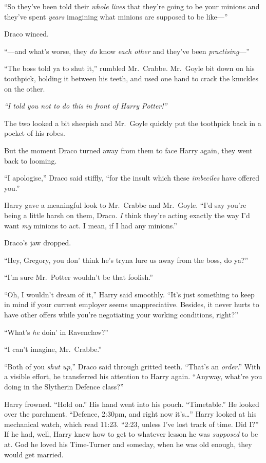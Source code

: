 ``So they've been told their \emph{whole lives} that they're going to be
your minions and they've spent \emph{years} imagining what minions are
supposed to be like---''

Draco winced.

``---and what's worse, they \emph{do} know \emph{each other} and they've
been \emph{practising}---''

``The boss told ya to shut it,'' rumbled Mr.~Crabbe. Mr.~Goyle bit down
on his toothpick, holding it between his teeth, and used one hand to
crack the knuckles on the other.

\emph{``I told you not to do this in front of Harry Potter!''}

The two looked a bit sheepish and Mr.~Goyle quickly put the toothpick
back in a pocket of his robes.

But the moment Draco turned away from them to face Harry again, they
went back to looming.

``I apologise,'' Draco said stiffly, ``for the insult which these
\emph{imbeciles} have offered you.''

Harry gave a meaningful look to Mr.~Crabbe and Mr.~Goyle. ``I'd say
you're being a little harsh on them, Draco. \emph{I} think they're
acting exactly the way I'd want \emph{my} minions to act. I mean, if I
had any minions.''

Draco's jaw dropped.

``Hey, Gregory, you don' think he's tryna lure us away from the boss, do
ya?''

``I'm sure Mr.~Potter wouldn't be that foolish.''

``Oh, I wouldn't dream of it,'' Harry said smoothly. ``It's just
something to keep in mind if your current employer seems unappreciative.
Besides, it never hurts to have other offers while you're negotiating
your working conditions, right?''

``What's \emph{he} doin' in Ravenclaw?''

``I can't imagine, Mr.~Crabbe.''

``Both of you \emph{shut up},'' Draco said through gritted teeth.
``That's an \emph{order}.'' With a visible effort, he transferred his
attention to Harry again. ``Anyway, what're you doing in the Slytherin
Defence class?''

Harry frowned. ``Hold on.'' His hand went into his pouch. ``Timetable.''
He looked over the parchment. ``Defence, 2:30pm, and right now
it's\ldots{}'' Harry looked at his mechanical watch, which read 11:23.
``2:23, unless I've lost track of time. Did I?'' If he had, well, Harry
knew how to get to whatever lesson he was \emph{supposed} to be at. God
he loved his Time-Turner and someday, when he was old enough, they would
get married.

